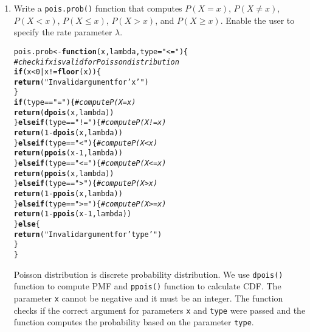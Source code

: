 \documentclass{article}\usepackage[]{graphicx}\usepackage[]{xcolor}
\makeatletter
\newcommand{\hlnum}[1]{\textcolor[rgb]{0.686,0.059,0.569}{#1}}%
\newcommand{\hlsng}[1]{\textcolor[rgb]{0.192,0.494,0.8}{#1}}%
\newcommand{\hlcom}[1]{\textcolor[rgb]{0.678,0.584,0.686}{\textit{#1}}}%
\newcommand{\hlopt}[1]{\textcolor[rgb]{0,0,0}{#1}}%
\newcommand{\hldef}[1]{\textcolor[rgb]{0.345,0.345,0.345}{#1}}%
\newcommand{\hlkwa}[1]{\textcolor[rgb]{0.161,0.373,0.58}{\textbf{#1}}}%
\newcommand{\hlkwb}[1]{\textcolor[rgb]{0.69,0.353,0.396}{#1}}%
\newcommand{\hlkwc}[1]{\textcolor[rgb]{0.333,0.667,0.333}{#1}}%
\newcommand{\hlkwd}[1]{\textcolor[rgb]{0.737,0.353,0.396}{\textbf{#1}}}%
\newenvironment{kframe}{%
 \def\at@end@of@kframe{}%
 \ifinner\ifhmode%
  \def\at@end@of@kframe{\end{minipage}}%
  \begin{minipage}{\columnwidth}%
 \fi\fi%
 \def\FrameCommand##1{\hskip\@totalleftmargin \hskip-\fboxsep
 \colorbox{shadecolor}{##1}\hskip-\fboxsep
     \hskip-\linewidth \hskip-\@totalleftmargin \hskip\columnwidth}%
 \MakeFramed {\advance\hsize-\width
   \@totalleftmargin\z@ \linewidth\hsize
   \@setminipage}}%
 {\par\unskip\endMakeFramed%
 \at@end@of@kframe}
\newenvironment{knitrout}{}{} %
\makeatother
\begin{document}
  \begin{enumerate}
    \item Write a \texttt{pois.prob()} function that computes $P(X=x)$, 
    $P(X \neq x)$, $P(X<x)$, $P(X \leq x)$, $P(X > x)$, and $P(X \geq x).$ Enable the user to specify the rate parameter $\lambda$.
\begin{knitrout}\scriptsize
{}\color{fgcolor}\begin{kframe}
\begin{alltt}
\hldef{pois.prob} \hlkwb{<-} \hlkwa{function}\hldef{(}\hlkwc{x}\hldef{,} \hlkwc{lambda}\hldef{,} \hlkwc{type}\hldef{=}\hlsng{"<="}\hldef{)\{}
  \hlcom{#check if x is valid for Poisson distribution}
  \hlkwa{if} \hldef{(x}\hlopt{<}\hlnum{0} \hlopt{|} \hldef{x} \hlopt{!=} \hlkwd{floor}\hldef{(x))\{}
    \hlkwd{return}\hldef{(}\hlsng{"Invalid argument for 'x'"}\hldef{)}
  \hldef{\}}
  \hlkwa{if} \hldef{(type} \hlopt{==} \hlsng{"="}\hldef{)\{} \hlcom{#compute P(X=x)}
    \hlkwd{return}\hldef{(}\hlkwd{dpois}\hldef{(x, lambda))}
  \hldef{\}}\hlkwa{else if}\hldef{(type} \hlopt{==} \hlsng{"!="}\hldef{)\{}  \hlcom{#compute P(X!=x)}
    \hlkwd{return}\hldef{(}\hlnum{1} \hlopt{-} \hlkwd{dpois}\hldef{(x, lambda))}
  \hldef{\}}\hlkwa{else if}\hldef{(type} \hlopt{==} \hlsng{"<"}\hldef{)\{}  \hlcom{#compute P(X<x)}
    \hlkwd{return}\hldef{(}\hlkwd{ppois}\hldef{(x} \hlopt{-}\hlnum{1}\hldef{, lambda))}
  \hldef{\}}\hlkwa{else if}\hldef{(type} \hlopt{==} \hlsng{"<="}\hldef{)\{} \hlcom{#compute P(X<=x)}
    \hlkwd{return}\hldef{(}\hlkwd{ppois}\hldef{(x, lambda))}
  \hldef{\}}\hlkwa{else if}\hldef{(type} \hlopt{==} \hlsng{">"}\hldef{)\{}  \hlcom{#compute P(X>x)}
    \hlkwd{return}\hldef{(}\hlnum{1} \hlopt{-} \hlkwd{ppois}\hldef{(x,lambda))}
  \hldef{\}}\hlkwa{else if} \hldef{(type} \hlopt{==} \hlsng{">="}\hldef{)\{}  \hlcom{#compute P(X>=x)}
    \hlkwd{return}\hldef{(}\hlnum{1} \hlopt{-} \hlkwd{ppois}\hldef{(x} \hlopt{-}\hlnum{1}\hldef{,lambda))}
  \hldef{\}}\hlkwa{else}\hldef{\{}
    \hlkwd{return}\hldef{(}\hlsng{"Invalid argument for 'type'"}\hldef{)}
  \hldef{\}}
\hldef{\}}
\end{alltt}
\end{kframe}
\end{knitrout}
Poisson distribution is discrete probability distribution. We use \texttt{dpois()} function to compute PMF and \texttt{ppois()} function to calculate CDF. The parameter \texttt{x} cannot be negative and it must be an integer. The function checks if the correct argument for parameters \texttt{x} and \texttt{type} were passed and the function computes the probability based on the parameter \texttt{type}. 

\end{enumerate}
\end{document}
